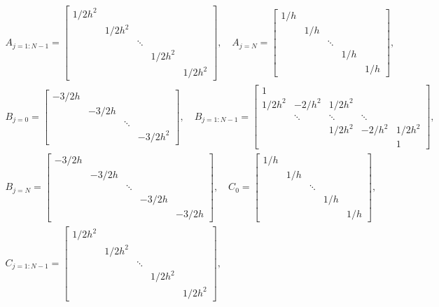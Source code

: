 \documentclass[reqno, 12pt]{amsart}
\begin{document}
    \begin{gather*}
        A_{j = 1:N-1} = \begin{bmatrix} 1/2h^2 \\ & 1/2h^2 \\ & & \ddots \\ & & & 1/2h^2 \\&  & & & 1/2h^2 \end{bmatrix}, \quad
        A_{j = N} = \begin{bmatrix} 1/h \\ & 1/h \\ & & \ddots \\ && & 1/h \\ & & & & 1/h \end{bmatrix}, \\
        B_{j = 0} = \begin{bmatrix} -3/2h \\ & -3/2h \\ & & \ddots \\ & & & -3/2h^2 \end{bmatrix}, \quad
        B_{j = 1:N-1} = \begin{bmatrix} 1 \\ 1/2h^2 & -2/h^2 & 1/2h^2 \\ & \ddots & \ddots & \ddots \\ & & 1/2h^2 & -2/h^2 & 1/2h^2 \\ & & & & 1  \end{bmatrix}, \\
        B_{j = N} = \begin{bmatrix} -3/2h \\ & -3/2h \\ & & \ddots \\ & & & -3/2h \\ & & & & -3/2h \end{bmatrix}, \quad
        C_{0} = \begin{bmatrix} 1/h \\ & 1/h \\ && \ddots \\ &&& 1/h \\ &&&& 1/h \end{bmatrix}, \\
        C_{j = 1:N-1} = \begin{bmatrix} 1/2h^2 \\ & 1/2h^2 \\ & & \ddots \\ & & &  1/2h^2 \\ & & & & 1/2h^2 \end{bmatrix}, \quad

\end{gather*}
\end{document}
